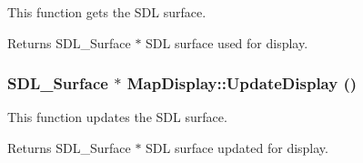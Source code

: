 This function gets the SDL surface. 

\begin{DoxyReturn}{Returns}
SDL\_\-Surface $\ast$ SDL surface used for display. 
\end{DoxyReturn}
\hypertarget{classMapDisplay_a1f8666a47c77fe1294af449e746430dc}{
\subsubsection[{UpdateDisplay}]{\setlength{\rightskip}{0pt plus 5cm}SDL\_\-Surface $\ast$ MapDisplay::UpdateDisplay ()}}
\label{classMapDisplay_a1f8666a47c77fe1294af449e746430dc}


This function updates the SDL surface. 

\begin{DoxyReturn}{Returns}
SDL\_\-Surface $\ast$ SDL surface updated for display. 
\end{DoxyReturn}



